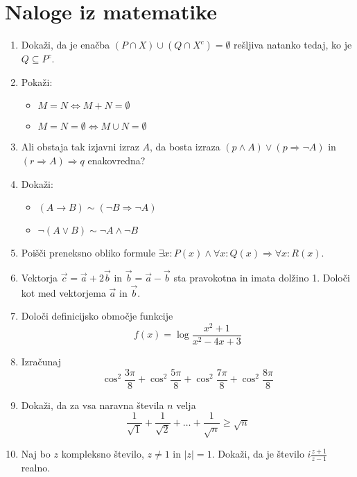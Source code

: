 \documentclass[a4paper,12pt]{article}
\begin{document}
\section*{Naloge iz matematike}
\begin{enumerate}
\item Dokaži, da je enačba $ (P \cap X ) \cup (Q \cap X^c) = \emptyset $ 
rešljiva natanko tedaj, ko je $ Q \subseteq P^c $.

\item Pokaži:
\begin{itemize}
\item $ M = N \iff M + N = \emptyset $ 
\item $ M = N = \emptyset \iff M \cup N = \emptyset $
\end{itemize}

\item Ali obstaja tak izjavni izraz $ A $, da bosta izraza 
$ (p \wedge A) \vee (p \Rightarrow \neg A) $  in 
$ (r \Rightarrow A) \Rightarrow q $ enakovredna?

\item Dokaži:
\begin{itemize}
    \item $ (A \rightarrow B) \sim  (\neg B \Rightarrow \neg A) $ 
    \item $ \neg (A \vee B) \sim \neg A \wedge \neg B $
\end{itemize}

\item Poišči preneksno obliko formule 
$ \exists x: P(x) \wedge \forall x: Q(x) \Rightarrow \forall x: R(x) $.

\item Vektorja $ \vec{c} = \vec{a} + 2 \vec{b} $ in 
$ \vec{b} = \vec{a} - \vec{b} $ sta pravokotna in imata dolžino 1. 
Določi kot med vektorjema $ \vec{a} $ in $ \vec{b} $.

\item Določi definicijsko območje funkcije
$$ f(x) = \log \frac{x^2 + 1}{x^2 - 4x + 3} $$

\item Izračunaj
$$ \cos^2 \frac{3 \pi}{8} + \cos^2 \frac{5 \pi}{8} + \cos^2 \frac{7 \pi}{8} +
\cos^2 \frac{8 \pi}{8} $$

\item Dokaži, da za vsa naravna števila $n$ velja
$$ \frac{1}{\sqrt{1}} + \frac{1}{\sqrt{2}} + \dots + \frac{1}{\sqrt{n}} \geq 
\sqrt{n} $$

\item Naj bo $ z $ kompleksno število, $ z \neq 1 $ in $ \vert z \vert = 1 $.
Dokaži, da je število $ i \frac{z + 1}{z - 1} $ realno.


\end{enumerate}
\end{document}
